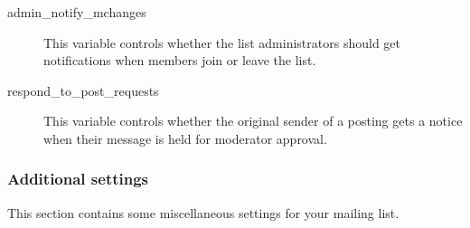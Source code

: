 \documentclass{howto}
\begin{document}
\begin{description}
\item[admin_notify_mchanges]
    This variable controls whether the list administrators should get
    notifications when members join or leave the list.

\item[respond_to_post_requests]
    This variable controls whether the original sender of a posting
    gets a notice when their message is held for moderator approval.

\end{description}

\subsubsection{Additional settings}

This section contains some miscellaneous settings for your mailing
list.
\end{document}
